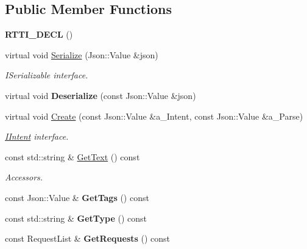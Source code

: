 \subsection*{Public Member Functions}
\begin{DoxyCompactItemize}
\item 
\mbox{\label{class_request_intent_a8f4ddd4bafa932a05102605133e89b36}} 
{\bfseries R\+T\+T\+I\+\_\+\+D\+E\+CL} ()
\item 
\mbox{\label{class_request_intent_ad6c5dad4872b07b4187601e9f88fccd4}} 
virtual void \hyperlink{class_request_intent_ad6c5dad4872b07b4187601e9f88fccd4}{Serialize} (Json\+::\+Value \&json)
\begin{DoxyCompactList}\small\item\em I\+Serializable interface. \end{DoxyCompactList}\item 
\mbox{\label{class_request_intent_a36e0ca59871afe19fb6410f91af61515}} 
virtual void {\bfseries Deserialize} (const Json\+::\+Value \&json)
\item 
\mbox{\label{class_request_intent_a7cd5569cdbf69eb1522c47d790de2251}} 
virtual void \hyperlink{class_request_intent_a7cd5569cdbf69eb1522c47d790de2251}{Create} (const Json\+::\+Value \&a\+\_\+\+Intent, const Json\+::\+Value \&a\+\_\+\+Parse)
\begin{DoxyCompactList}\small\item\em \hyperlink{class_i_intent}{I\+Intent} interface. \end{DoxyCompactList}\item 
\mbox{\label{class_request_intent_aa741e3071cf16b00f6fa3f343adb9251}} 
const std\+::string \& \hyperlink{class_request_intent_aa741e3071cf16b00f6fa3f343adb9251}{Get\+Text} () const
\begin{DoxyCompactList}\small\item\em Accessors. \end{DoxyCompactList}\item 
\mbox{\label{class_request_intent_a3d9b12f73579b06e99792806117d6f0c}} 
const Json\+::\+Value \& {\bfseries Get\+Tags} () const
\item 
\mbox{\label{class_request_intent_aa0011f7def60256bfcbb72d86fc06bae}} 
const std\+::string \& {\bfseries Get\+Type} () const
\item 
\mbox{\label{class_request_intent_a44be520ee04418428eb577bb4a306540}} 
const Request\+List \& {\bfseries Get\+Requests} () const
\end{DoxyCompactItemize}
